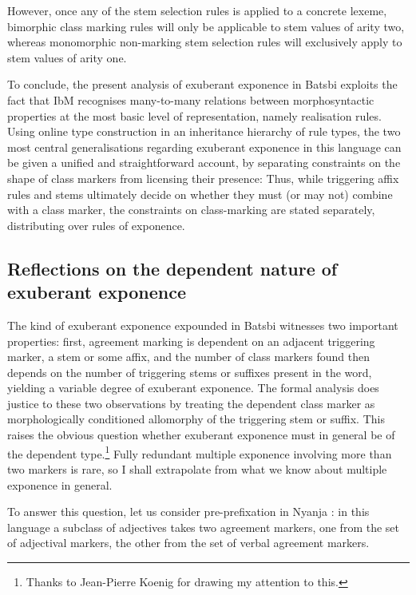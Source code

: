 \documentclass[output=paper]{langsci/langscibook}
\begin{document}
However, once any of the stem selection rules is applied to a concrete
lexeme, bimorphic class marking rules will only be applicable to stem
values of arity two, whereas monomorphic non-marking stem
selection rules will exclusively apply to stem values of arity
one.

To conclude, the present analysis of exuberant exponence in Batsbi
exploits the fact that IbM recognises many-to-many relations between
morphosyntactic properties at the most basic level of representation,
namely realisation rules. Using  online type
construction in an inheritance  hierarchy of rule types, the two most
central generalisations regarding exuberant exponence in this language
can be given a unified and straightforward account, by separating
constraints on the shape of class markers from licensing their
presence: Thus, while triggering affix rules and stems ultimately
decide on whether they must (or may not) combine with a class marker,
the constraints on class-marking are stated separately, distributing
over rules of exponence.  

\subsection{Reflections on the dependent nature of exuberant exponence}

The kind of exuberant exponence expounded in Batsbi witnesses two
important properties: first, agreement marking is dependent on an
adjacent triggering marker, a stem or some affix, and the number of
class markers found then depends on the number of triggering stems or
suffixes present in the word, yielding a variable degree of exuberant
exponence. The formal analysis does justice to these two observations
by treating the dependent class marker as morphologically conditioned
allomorphy of the triggering stem or suffix. This raises the obvious
question whether exuberant exponence must in general be of the
dependent type.\footnote{Thanks to Jean-Pierre Koenig for drawing
  my attention to this.} Fully redundant multiple exponence involving
more than two markers is rare, so I shall extrapolate from what we
know about multiple exponence in general.

To answer this question, let us consider pre-prefixation in Nyanja
\citep{Stump01,Crysmann:14:OUP}: in
this language a subclass of adjectives takes two agreement markers,
one from the set of adjectival markers, the other from the set of
verbal agreement markers.
\end{document}
